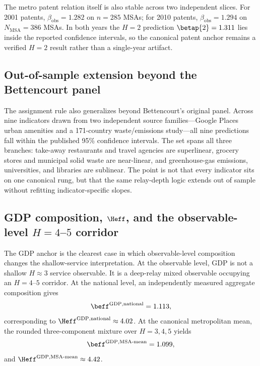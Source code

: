 The metro patent relation itself is also stable across two independent slices.
For 2001 patents, $\beta_{\mathrm{obs}}=1.282$ on $n=285$ MSAs; for 2010
patents, $\beta_{\mathrm{obs}}=1.294$ on $N_{\mathrm{MSA}}=386$ MSAs. In
both years the $H=2$ prediction $\betap{2}=1.311$ lies inside the reported
confidence intervals, so the canonical patent anchor remains a verified
$H=2$ result rather than a single-year artifact.

\subsection{Out-of-sample extension beyond the Bettencourt panel}
The assignment rule also generalizes beyond Bettencourt's original panel. Across
nine indicators drawn from two independent source families---Google Places urban
amenities and a 171-country waste/emissions study---all nine predictions fall
within the published 95\% confidence intervals. The set spans all three
branches: take-away restaurants and travel agencies are superlinear, grocery
stores and municipal solid waste are near-linear, and greenhouse-gas emissions,
universities, and libraries are sublinear. The point is not that every
indicator sits on one canonical rung, but that the same relay-depth logic
extends out of sample without refitting indicator-specific slopes.

\subsection{GDP composition, \(\Heff\), and the observable-level \(H=4\)--\(5\) corridor}
The GDP anchor is the clearest case in which observable-level composition changes the shallow-service interpretation. At the observable level, GDP is not a shallow \(H\approx 3\) service observable. It is a deep-relay mixed observable occupying an \(H=4\)--\(5\) corridor. At the national level, an independently measured aggregate composition gives
\begin{equation}
\beff^{\mathrm{GDP,national}}=1.113,
\label{eq:gdp_nat}
\end{equation}
corresponding to
\(\Heff^{\mathrm{GDP,national}}\approx 4.02\). At the canonical metropolitan
mean, the rounded three-component mixture over \(H=3,4,5\) yields
\begin{equation}
\beff^{\mathrm{GDP,MSA\text{-}mean}}=1.099,
\label{eq:gdp_msa_mean}
\end{equation}
and \(\Heff^{\mathrm{GDP,MSA\text{-}mean}}\approx 4.42\).

